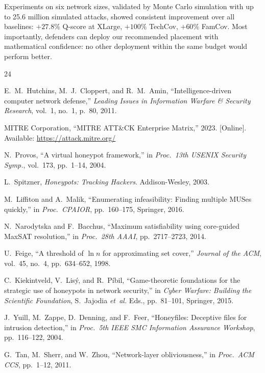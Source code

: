\documentclass[journal]{IEEEtran}
\newcommand{\etal}{\emph{et~al.}}
\begin{document}
Experiments on six network sizes, validated by Monte Carlo
simulation with up to 25.6 million simulated attacks,
showed consistent improvement over all baselines:
$+27.8\%$ Q-score at XLarge, $+100\%$ TechCov,
$+60\%$ FamCov.
Most importantly, defenders can deploy our recommended
placement with mathematical confidence: no other deployment
within the same budget would perform better.

\begin{thebibliography}{24}

E.~M.~Hutchins, M.~J.~Cloppert, and R.~M.~Amin,
``Intelligence-driven computer network defense,''
\textit{Leading Issues in Information Warfare \& Security
Research}, vol.~1, no.~1, p.~80, 2011.

MITRE Corporation, ``MITRE ATT\&CK Enterprise Matrix,'' 2023.
[Online]. Available: \url{https://attack.mitre.org/}

N.~Provos, ``A virtual honeypot framework,''
in \textit{Proc.\ 13th USENIX Security Symp.},
vol.~173, pp.~1--14, 2004.

L.~Spitzner, \textit{Honeypots: Tracking Hackers}.
Addison-Wesley, 2003.

M.~Liffiton and A.~Malik,
``Enumerating infeasibility: Finding multiple MUSes quickly,''
in \textit{Proc.\ CPAIOR}, pp.~160--175, Springer, 2016.

N.~Narodytska and F.~Bacchus,
``Maximum satisfiability using core-guided MaxSAT resolution,''
in \textit{Proc.\ 28th AAAI}, pp.~2717--2723, 2014.

U.~Feige,
``A threshold of $\ln n$ for approximating set cover,''
\textit{Journal of the ACM}, vol.~45, no.~4,
pp.~634--652, 1998.

C.~Kiekintveld, V.~Lis\'{y}, and R.~P\'{i}bil,
``Game-theoretic foundations for the strategic use of
honeypots in network security,''
in \textit{Cyber Warfare: Building the Scientific Foundation},
S.~Jajodia \etal{} Eds., pp.~81--101, Springer, 2015.

J.~Yuill, M.~Zappe, D.~Denning, and F.~Feer,
``Honeyfiles: Deceptive files for intrusion detection,''
in \textit{Proc.\ 5th IEEE SMC Information Assurance
Workshop}, pp.~116--122, 2004.

G.~Tan, M.~Sherr, and W.~Zhou,
``Network-layer obliviousness,''
in \textit{Proc.\ ACM CCS}, pp.~1--12, 2011.


\end{thebibliography}
\end{document}
